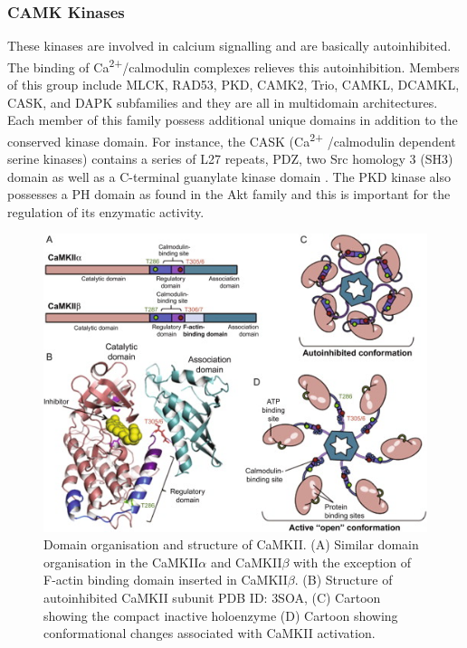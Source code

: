 \documentclass[a4paper, 11pt]{report}
\begin{document}
\subsubsection{CAMK Kinases}
These kinases are involved in calcium signalling and are basically autoinhibited. The binding of Ca\textsuperscript{2+}/calmodulin complexes relieves this autoinhibition. Members of this group include MLCK, RAD53, PKD, CAMK2, Trio, CAMKL, DCAMKL, CASK, and DAPK subfamilies and they are all in multidomain architectures. Each member of this family possess additional unique domains in addition to the conserved kinase domain. For instance, the CASK (Ca\textsuperscript{2+} /calmodulin dependent serine kinases) contains a series of L27 repeats, PDZ, two Src homology 3 (SH3) domain as well as a C-terminal guanylate kinase domain \cite{rakshambikai2015typical}. The PKD kinase also possesses a PH domain as found in the Akt family and this is important for the regulation of its enzymatic activity.\\
\begin{figure}[H]
	\includegraphics[width=.8\linewidth]{figures/camk_kinase.jpg}
	\centering
	\caption{Domain organisation and structure of CaMKII. (A) Similar domain organisation in the CaMKII$\alpha$ and CaMKII$\beta$ with the exception of F-actin binding domain inserted in CaMKII$\beta$. (B) Structure of autoinhibited CaMKII subunit PDB ID: 3SOA, (C) Cartoon showing the compact inactive holoenzyme (D) Cartoon showing conformational changes associated with CaMKII activation.}
	\label{camk_kinase}
\end{figure}
\end{document}
